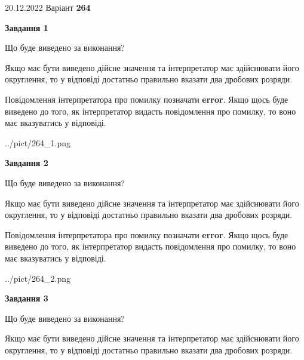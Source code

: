 \documentclass[12pt, ukrainian]{article}
\begin{document}
{20.12.2022 Варіант \No \textbf { 264 }\par}
{
\begin {Large}

{\begin {center}\textbf{Завдання 1}\end {center}}\par
Що буде виведено за виконання? \par

Якщо має бути виведено дійсне значення та інтерпретатор має здійснювати його округлення, 
то у відповіді достатньо правильно вказати два дробових розряди.

Повідомлення інтерпретатора про помилку позначати \textbf{error}.
Якщо щось буде виведено до того, як інтерпретатор видасть повідомлення про помилку, 
то воно має вказуватись у відповіді. \par

\begin{center}
	{../pict/264_1.png}
\end{center}
\newpage

{\begin {center}\textbf{Завдання 2}\end {center}}\par
Що буде виведено за виконання? \par

Якщо має бути виведено дійсне значення та інтерпретатор має здійснювати його округлення, 
то у відповіді достатньо правильно вказати два дробових розряди.

Повідомлення інтерпретатора про помилку позначати \textbf{error}.
Якщо щось буде виведено до того, як інтерпретатор видасть повідомлення про помилку, 
то воно має вказуватись у відповіді. \par

\begin{center}
	{../pict/264_2.png}
\end{center}
\newpage

{\begin {center}\textbf{Завдання 3}\end {center}}\par
Що буде виведено за виконання? \par

Якщо має бути виведено дійсне значення та інтерпретатор має здійснювати його округлення, 
то у відповіді достатньо правильно вказати два дробових розряди.


\end{Large}}
\end{document}
